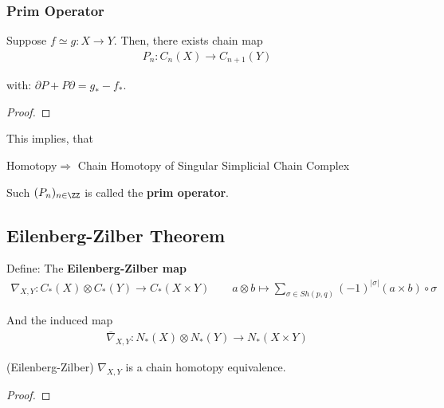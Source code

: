 \documentclass[Total.tex]{subfiles}
\begin{document}
				\subsubsection{Prim Operator}
					\begin{lemma}
						Suppose $f\simeq g:X\rightarrow Y$. Then, there exists chain map
						\begin{gather*}
							P_n:C_n(X)\rightarrow C_{n+1}(Y)
						\end{gather*}

						with: $\partial P+P\partial=g_*-f_*$.
						\begin{center}
						\end{center} 
					\end{lemma}
					\begin{proof}
						
					\end{proof}

					This implies, that
					\begin{center}
						Homotopy$\Rightarrow$ Chain Homotopy of Singular Simplicial Chain Complex
					\end{center}
					\begin{Def}
						Such  $(P_n)_{n\in \ZZ}$ is called the \textbf{prim operator}.
					\end{Def}
			\subsection{Eilenberg-Zilber Theorem}
				\begin{Def}
					Define: The \textbf{Eilenberg-Zilber map}
					\begin{gather*}
						\nabla_{X,Y}:C_*(X)\otimes C_*(Y)\rightarrow C_*(X\times Y)\qquad a\otimes b\mapsto \sum_{\sigma\in Sh(p,q)}(-1)^{|\sigma|}(a\times b)\circ \sigma
					\end{gather*}

					And the induced map
					\begin{gather*}
						\bar{\nabla}_{X,Y}:N_*(X)\otimes N_*(Y)\rightarrow N_*(X\times Y)
					\end{gather*}
				\end{Def}
				\begin{theorem}
					(Eilenberg-Zilber) $\nabla_{X,Y}$ is a chain homotopy equivalence.
				\end{theorem}
				\begin{proof}
					
				\end{proof}
\end{document}
